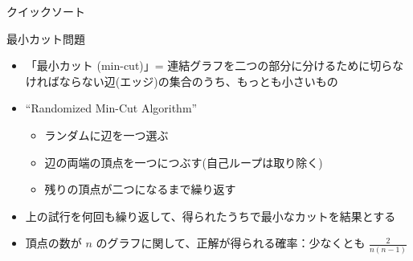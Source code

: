 \begin{frame}[t,fragile]{クイックソート}
\end{frame}

\begin{frame}[t,fragile]{最小カット問題}
  \begin{itemize}
    \setlength{\itemsep}{1em}
  \item 「最小カット (min-cut)」= 連結グラフを二つの部分に分けるために切らなければならない辺(エッジ)の集合のうち、もっとも小さいもの
  \item ``Randomized Min-Cut Algorithm''
    \begin{itemize}
    \item ランダムに辺を一つ選ぶ
    \item 辺の両端の頂点を一つにつぶす(自己ループは取り除く)
    \item 残りの頂点が二つになるまで繰り返す
    \end{itemize}
  \item 上の試行を何回も繰り返して、得られたうちで最小なカットを結果とする
  \item 頂点の数が $n$ のグラフに関して、正解が得られる確率：少なくとも $\frac{2}{n(n-1)}$
  \end{itemize}
\end{frame}

